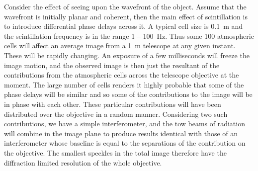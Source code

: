 Consider the effect of seeing upon the wavefront of the object. Assume that the wavefront is initially planar and coherent, then the main effect of scintillation is to introduce differential phase delays across it. A typical cell size is 0.1~m and the scintillation frequency is in the range 1 -- 100~Hz. Thus some 100 atmospheric cells will affect an average image from a 1~m telescope at any given instant. These will be rapidly changing. An exposure of a few milliseconds will freeze the image motion, and the observed image is then just the resultant of the contributions from the atmospheric cells across the telescope objective at the moment. The large number of cells renders it highly probable that some of the phase delays will be similar and so some of the contributions to the image will be in phase with each other. These particular contributions will have been distributed over the objective in a random manner. Considering two such contributions, we have a simple interferometer, and the tow beams of radiation will combine in the image plane to produce results identical with those of an interferometer whose baseline is equal to the separations of the contribution on the objective. The smallest speckles in the total image therefore have the diffraction limited resolution of the whole objective. 

%
